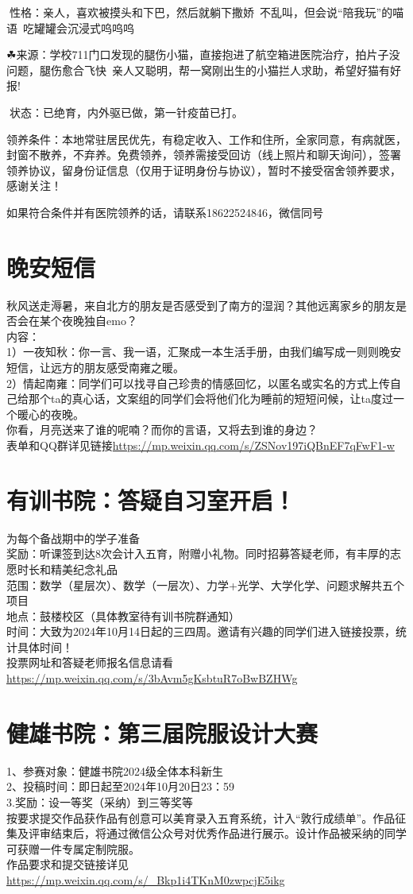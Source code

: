 \documentclass[letterpaper, 12pt]{article}
\begin{document}
\begin{multicols}{2}
🍁性格：亲人，喜欢被摸头和下巴，然后就躺下撒娇~不乱叫，但会说“陪我玩”的喵语~吃罐罐会沉浸式呜呜呜~

☘来源：学校711门口发现的腿伤小猫，直接抱进了航空箱进医院治疗，拍片子没问题，腿伤愈合飞快~亲人又聪明，帮一窝刚出生的小猫拦人求助，希望好猫有好报!

💐状态：已绝育，内外驱已做，第一针疫苗已打。

领养条件：本地常驻居民优先，有稳定收入、工作和住所，全家同意，有病就医，封窗不散养，不弃养。免费领养，领养需接受回访（线上照片和聊天询问），签署领养协议，留身份证信息（仅用于证明身份与协议），暂时不接受宿舍领养要求，感谢关注！

如果符合条件并有医院领养的话，请联系18622524846，微信同号~
\section{晚安短信}
秋风送走溽暑，来自北方的朋友是否感受到了南方的湿润？其他远离家乡的朋友是否会在某个夜晚独自emo？\\
内容：\\
1）一夜知秋：你一言、我一语，汇聚成一本生活手册，由我们编写成一则则晚安短信，让远方的朋友感受南雍之暖。\\
2）情起南雍：同学们可以找寻自己珍贵的情感回忆，以匿名或实名的方式上传自己给那个ta的真心话，文案组的同学们会将他们化为睡前的短短问候，让ta度过一个暖心的夜晚。\\
你看，月亮送来了谁的呢喃？而你的言语，又将去到谁的身边？\\
表单和QQ群详见链接\url{https://mp.weixin.qq.com/s/ZSNov197iQBnEF7qFwF1-w}
\section{有训书院：答疑自习室开启！}
为每个备战期中的学子准备\\
奖励：听课签到达8次会计入五育，附赠小礼物。同时招募答疑老师，有丰厚的志愿时长和精美纪念礼品\\
范围：数学（星层次）、数学（一层次）、力学+光学、大学化学、问题求解共五个项目\\
地点：鼓楼校区（具体教室待有训书院群通知）\\
时间：大致为2024年10月14日起的三四周。邀请有兴趣的同学们进入链接投票，统计具体时间！\\
投票网址和答疑老师报名信息请看\url{https://mp.weixin.qq.com/s/3bAvm5gKsbtuR7oBwBZHWg}
\section{健雄书院：第三届院服设计大赛}
1、参赛对象：健雄书院2024级全体本科新生\\
2、投稿时间：即日起至2024年10月20日23：59\\
3.奖励：设一等奖（采纳）到三等奖等\\
按要求提交作品获作品有创意可以美育录入五育系统，计入“敦行成绩单”。作品征集及评审结束后，将通过微信公众号对优秀作品进行展示。设计作品被采纳的同学可获赠一件专属定制院服。\\
作品要求和提交链接详见\url{https://mp.weixin.qq.com/s/_Bkp1i4TKnM0zwpcjE5ikg}

\end{multicols}
\end{document}
